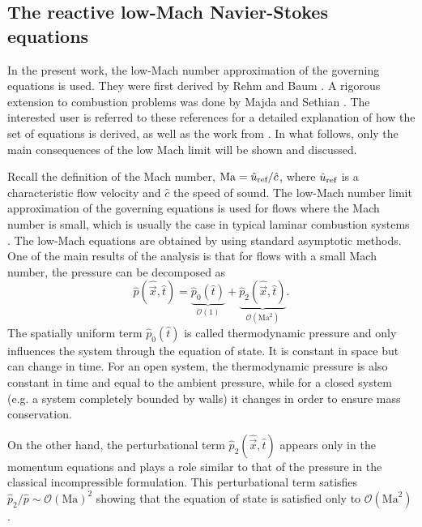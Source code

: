 \subsection{The reactive low-Mach Navier-Stokes equations} \label{ssec:NonDimLowMachEquations}

In the present work, the low-Mach number approximation of the governing equations is used.  They were first derived by Rehm and Baum \parencite{rehmEquationsMotionThermally1978}. A rigorous extension to combustion problems was done by Majda and Sethian \parencite{majdaDerivationNumericalSolution1985}. The interested user is referred to these references for a detailed explanation of how the set of equations is derived, as well as the work from \textcite{mullerLowMachNumberAsymptoticsNavierStokes1998}. In what follows, only the main consequences of the low Mach limit will be shown and discussed.

Recall the definition of the Mach number, $\text{Ma} = \hat u_{\text{ref}}/\hat c$, where $\hat u_{\text{ref}}$ is a characteristic flow velocity and $\hat{c}$ the speed of sound. The low-Mach number limit approximation of the governing equations is used for flows where the Mach number is small, which is usually the case in typical laminar combustion systems \parencite{dobbinsFullyImplicitCompact2010}.
The low-Mach equations are obtained by using standard asymptotic methods. One of the main results of the analysis is that for flows with a small Mach number, the pressure can be decomposed as
\begin{equation}
	\hat p(\hat {\vec{x}}, \hat t) = \underbrace{\hat p_0(\hat t)}_{\mathcal{O}(1)} + \underbrace{\hat p_2(\hat{\vec{x}},\hat t)}_{\mathcal{O}(\text{Ma}^2)} .
\end{equation}
The spatially uniform term $\hat p_0(\hat t)$ is called thermodynamic pressure and only influences the system through the equation of state. It is constant in space but can change in time.  For an open system, the thermodynamic pressure is also constant in time and equal to the ambient pressure, while for a closed system (e.g. a system completely bounded by walls) it changes in order to ensure mass conservation. 

On the other hand, the perturbational term $\hat p_2(\hat{\vec{x}},\hat t)$ appears only in the momentum equations and plays a role similar to that of the pressure in the classical incompressible formulation. This perturbational term satisfies $\hat p_2/\hat p \sim \mathcal{O}(\text{Ma})^2$ \parencite{dobbinsFullyImplicitCompact2010,nonakaConservativeThermodynamicallyConsistent2018} showing that  the equation of state is satisfied only to $\mathcal{O}(\text{Ma}^2)$.

